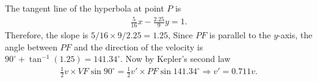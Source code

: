 \documentclass{article}
\begin{document}
\begin{enumerate}
  The tangent line of the hyperbola at point $P$ is
  \begin{align*}
    \frac{5}{16}x - \frac{2.25}{9}y = 1.
  \end{align*}
  Therefore, the slope is $5/16\times 9/2.25 = 1.25$, Since $PF$ is parallel to the $y$-axis, the angle between $PF$ and the direction of the velocity is $90^\circ + \tan ^{-1}(1.25) = 141.34^\circ$. Now by Kepler's second law
  \begin{align*}
   \frac{1}{2}v\times VF \sin 90^\circ = \frac{1}{2} v' \times  PF \sin 141.34^\circ\Rightarrow v' = 0.711v.
  \end{align*}

   \begin{figure}[ht]
    \centering
  \end{figure}

  
\end{enumerate}
\end{document}
